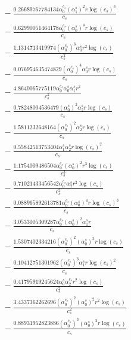 \documentclass[10pt]{article}
\begin{document}
\begin{align*}
&{}  - \frac{0.26689767784134 \alpha_{0}^{c_s} \left(\alpha_{1}^s\right)^{2} r \log{\left(c_{s} \right)}^{3}}{c_{s}} \\
&{}  - \frac{0.62990051464178 \alpha_{0}^{c_s} \left(\alpha_{0}^s\right)^{4} r \log{\left(c_{s} \right)}}{c_{s}} \\
&{}  - \frac{1.1314713419974 \left(\alpha_{0}^{c_s}\right)^{3} \alpha_{0}^s r^{2} \log{\left(c_{s} \right)}}{c_{s}^{2}} \\
&{}  - \frac{0.076954635474829 \left(\alpha_{0}^{c_s}\right)^{4} \alpha_{0}^s r \log{\left(c_{s} \right)}}{c_{s}} \\
&{}  - \frac{4.8640065775119 \alpha_{0}^{c_s} \alpha_{0}^s \alpha_{1}^s r^{2}}{c_{s}^{2}} \\
&{}  - \frac{0.78248004536479 \left(\alpha_{0}^s\right)^{2} \alpha_{2}^s r \log{\left(c_{s} \right)}}{c_{s}} \\
&{}  - \frac{1.5811232648164 \left(\alpha_{0}^{c_s}\right)^{2} \alpha_{2}^s r \log{\left(c_{s} \right)}}{c_{s}} \\
&{}  - \frac{0.55842513753404 \alpha_{1}^s \alpha_{2}^s r \log{\left(c_{s} \right)}^{2}}{c_{s}} \\
&{}  - \frac{1.1754009486504 \alpha_{0}^{c_s} \left(\alpha_{0}^s\right)^{2} r^{3} \log{\left(c_{s} \right)}}{c_{s}^{3}} \\
&{}  - \frac{0.71021433456542 \alpha_{0}^{c_s} \alpha_{2}^s r^{2} \log{\left(c_{s} \right)}}{c_{s}^{2}} \\
&{}  - \frac{0.088965892613781 \alpha_{0}^{c_s} \left(\alpha_{0}^s\right)^{4} r \log{\left(c_{s} \right)}^{3}}{c_{s}} \\
&{}  - \frac{3.0533005309287 \alpha_{0}^{c_s} \left(\alpha_{0}^s\right)^{2} \alpha_{1}^s r}{c_{s}} \\
&{}  - \frac{1.5307402334216 \left(\alpha_{0}^{c_s}\right)^{2} \left(\alpha_{0}^s\right)^{3} r \log{\left(c_{s} \right)}}{c_{s}} \\
&{}  - \frac{0.10412751301962 \left(\alpha_{0}^{c_s}\right)^{3} \alpha_{1}^s r \log{\left(c_{s} \right)}^{2}}{c_{s}} \\
&{}  - \frac{0.41795919245624 \alpha_{0}^s \alpha_{2}^{c_s} r^{2} \log{\left(c_{s} \right)}}{c_{s}^{2}} \\
&{}  - \frac{3.4337362262696 \left(\alpha_{0}^{c_s}\right)^{2} \left(\alpha_{0}^s\right)^{2} r^{2} \log{\left(c_{s} \right)}}{c_{s}^{2}} \\
&{}  - \frac{0.88931952823886 \left(\alpha_{0}^{c_s}\right)^{3} \left(\alpha_{0}^s\right)^{2} r \log{\left(c_{s} \right)}}{c_{s}} \\

\end{align*}
\end{document}
